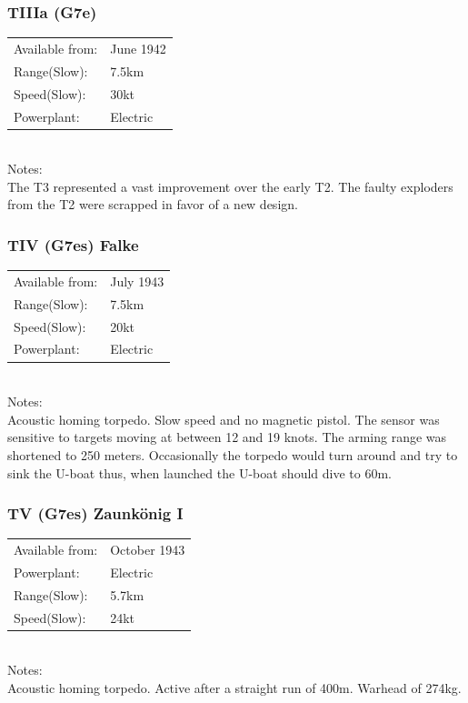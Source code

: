 \documentclass{article}
\begin{document}
\subsubsection{TIIIa (G7e)}
\begin{tabular}{l|l}
Available from:& June 1942\\
Range(Slow):& 7.5km\\ %
Speed(Slow):& 30kt\\
Powerplant:&Electric\\
\end{tabular} \\
Notes:\\
The T3 represented a vast improvement over the early T2. The faulty exploders from the T2 were scrapped in favor of a new design.

\subsubsection{TIV (G7es) Falke}
\begin{tabular}{l|l}
Available from:& July 1943\\
Range(Slow):& 7.5km\\ %
Speed(Slow):& 20kt\\
Powerplant:&Electric\\
\end{tabular} \\
Notes:\\
Acoustic homing torpedo. 
Slow speed and no magnetic pistol. The sensor was sensitive to targets moving at between 12 and 19 knots. The arming range was shortened to 250 meters. Occasionally the torpedo would turn around and try to sink the U-boat thus, when launched the U-boat should dive to 60m.


\subsubsection{TV (G7es) Zaunk\"onig I}
\begin{tabular}{l|l}
Available from:& October 1943\\
Powerplant:&Electric\\
Range(Slow):& 5.7km\\
Speed(Slow):& 24kt\\
\end{tabular} \\
Notes:\\
Acoustic homing torpedo. Active after a straight run of 400m. Warhead of 274kg.
\end{document}
